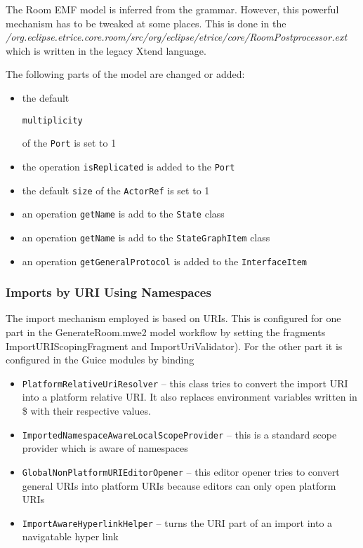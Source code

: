 The Room EMF model is inferred from the grammar. However, this powerful mechanism has to be tweaked at some places.
This is done in the \textit{/org.eclipse.etrice.core.room/src/org/eclipse/etrice/core/RoomPostprocessor.ext} which is written in the legacy Xtend language.

The following parts of the model are changed or added:
\begin{itemize}
\item the default \begin{verbatim}multiplicity\end{verbatim} of the \texttt{Port} is set to 1
\item the operation \texttt{isReplicated} is added to the \texttt{Port}
\item the default \texttt{size} of the \texttt{ActorRef} is set to 1
\item an operation \texttt{getName} is add to the \texttt{State} class
\item an operation \texttt{getName} is add to the \texttt{StateGraphItem} class
\item an operation \texttt{getGeneralProtocol} is added to the \texttt{InterfaceItem}
\end{itemize}

\subsubsection{Imports by URI Using Namespaces}

The import mechanism employed is based on URIs. This is configured for one part in the GenerateRoom.mwe2 model workflow by setting the fragments ImportURIScopingFragment and ImportUriValidator). For the other part it is configured in the Guice modules by binding
\begin{itemize}
\item \texttt{PlatformRelativeUriResolver} -- this class tries to convert the import URI into a platform relative URI. It also replaces environment variables written in \${} with their respective values.
\item \texttt{ImportedNamespaceAwareLocalScopeProvider} -- this is a standard scope provider which is aware of namespaces
\item \texttt{GlobalNonPlatformURIEditorOpener} -- this editor opener tries to convert general URIs into platform URIs because editors can only open platform URIs
\item \texttt{ImportAwareHyperlinkHelper} -- turns the URI part of an import into a navigatable hyper link
\end{itemize}

